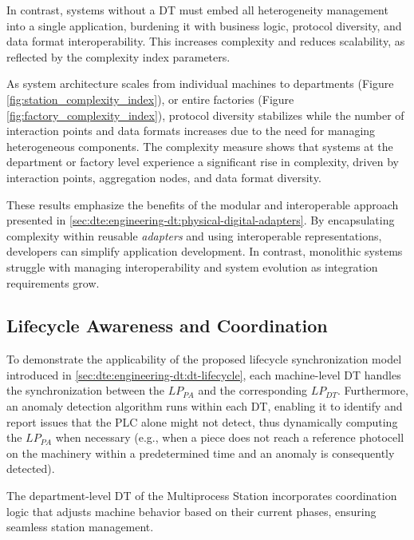 In contrast, systems without a \ac{DT} must embed all heterogeneity management into a single application, burdening it with business logic, protocol diversity, and data format interoperability.
This increases complexity and reduces scalability, as reflected by the complexity index parameters.

As system architecture scales from individual machines to departments (Figure \ref{fig:station_complexity_index}), or entire factories (Figure \ref{fig:factory_complexity_index}), protocol diversity stabilizes while the number of interaction points and data formats increases due to the need for managing heterogeneous components.
The complexity measure shows that systems at the department or factory level experience a significant rise in complexity, driven by interaction points, aggregation nodes, and data format diversity.

These results emphasize the benefits of the modular and interoperable approach presented in \cref{sec:dte:engineering-dt:physical-digital-adapters}.
By encapsulating complexity within reusable \emph{adapters} and using interoperable representations, developers can simplify application development.
In contrast, monolithic systems struggle with managing interoperability and system evolution as integration requirements grow.

\subsection{Lifecycle Awareness and Coordination}

To demonstrate the applicability of the proposed lifecycle synchronization model introduced in \cref{sec:dte:engineering-dt:dt-lifecycle}, 
each machine-level \ac{DT} handles the synchronization between the $LP_{PA}$ and the corresponding $LP_{DT}$.
%
Furthermore, an anomaly detection algorithm runs within each \ac{DT}, enabling it to identify and report issues that the PLC alone might not detect, thus dynamically computing the $LP_{PA}$ when necessary (e.g., when a piece does not reach a reference photocell on the machinery within a predetermined time and an anomaly is consequently detected).

The department-level \ac{DT} of the Multiprocess Station incorporates coordination logic that adjusts machine behavior based on their current phases, ensuring seamless station management.

